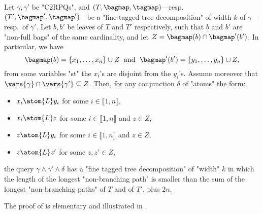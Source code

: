 \begin{proposition}
    \AP\label{prop:connecting-tree-decompositions}
    Let $\gamma,\gamma'$ be "C2RPQs",
    and $(T,\bagmap,\tagmap)$---resp.\ $(T',\bagmap',\tagmap')$---be
	a "fine tagged tree decomposition" of width $k$ of $\gamma$---resp.\ of $\gamma'$.
    Let $b, b'$ be leaves of $T$ and $T'$ respectively, such that $b$ and $b'$ are "non-full bags"
	of the same cardinality,
	and let $Z = \bagmap(b) \cap \bagmap'(b')$. In particular, we have
    \[
        \bagmap(b) = \{x_1,\hdots,x_n\}\cup Z
        \;\text{ and }\;
        \bagmap'(b') = \{y_1,\hdots,y_n\}\cup Z,
    \]
	from some variables "st" the $x_i$'s are disjoint from the $y_i$'s.
	Assume moreover that $\vars{\gamma} \cap \vars{\gamma'} \subseteq Z$.
    Then, for any conjunction $\delta$ of "atoms" the form:
	\begin{itemize}
		\item $x_i \atom{L} y_i$ for some $i \in \lBrack 1, n \rBrack$,
		\item $x_i \atom{L} z$ for some $i \in \lBrack 1, n \rBrack$ and $z\in Z$,
		\item $z \atom{L} y_i$ for some $i \in \lBrack 1, n \rBrack$ and $z\in Z$,
		\item $z \atom{L} z'$ for some $z, z'\in Z$,
	\end{itemize}
	the query $\gamma \land \gamma' \land \delta$
	has a "fine tagged tree decomposition"
    of "width" $k$ in which the length of the longest "non-branching path" is smaller
    than the sum of the longest "non-branching paths" of $T$ and of $T'$, plus $2n$.
\end{proposition}

The proof of  is elementary and illustrated in .

